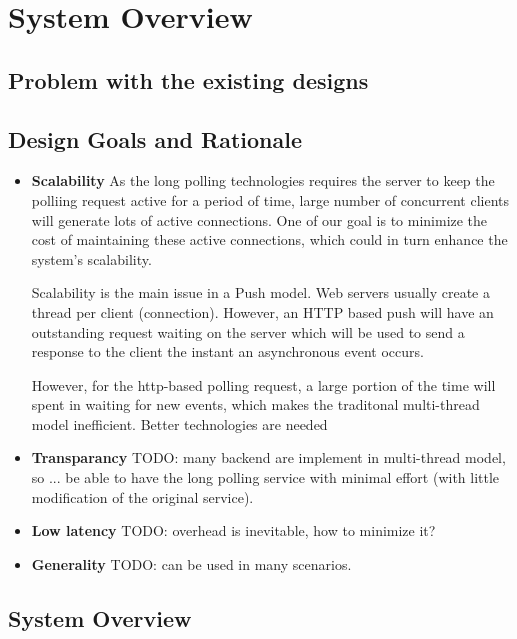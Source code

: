 \section {System Overview}
\subsection{Problem with the existing designs\\}

\subsection{Design Goals and Rationale\\}

\begin{itemize}
\item {\bf Scalability}  
    As the long polling technologies requires the server to keep the polliing request active for a period of time,
    large number of concurrent clients will generate lots of active connections. One of our goal is to minimize the 
    cost of maintaining these active connections, which could in turn enhance the system's scalability.
     
    Scalability is the main issue in a Push model. Web servers usually create a thread per
    client (connection). However, an HTTP based push will have an
    outstanding request waiting on the server which will be used to send a response to the
    client the instant an asynchronous event occurs. 
    
    However, for the http-based polling request, a large portion of the time will spent in waiting for new events, which
    makes the traditonal multi-thread model inefficient. Better technologies are needed 

\item {\bf Transparancy} TODO: many backend are implement in multi-thread model, so ... be able to have the long polling service with minimal effort (with little modification of the original service).

\item {\bf Low latency} TODO: overhead is inevitable, how to minimize it?

\item {\bf Generality} TODO: can be used in many scenarios.

\end{itemize}

\subsection{System Overview\\}

